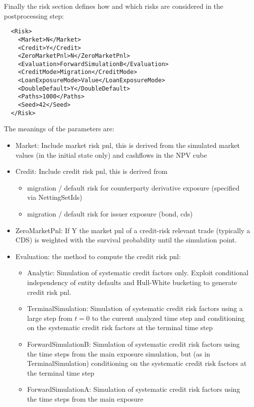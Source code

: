 \documentclass[12pt, a4paper]{article}
\begin{document}
Finally the risk section defines how and which risks are considered in the postprocessing step:

\begin{verbatim}
  <Risk>
    <Market>N</Market>
    <Credit>Y</Credit>
    <ZeroMarketPnl>N</ZeroMarketPnl>
    <Evaluation>ForwardSimulationB</Evaluation>
    <CreditMode>Migration</CreditMode>
    <LoanExposureMode>Value</LoanExposureMode>
    <DoubleDefault>Y</DoubleDefault>
    <Paths>1000</Paths>
    <Seed>42</Seed>
  </Risk>
\end{verbatim}

The meanings of the parameters are:

\begin{itemize}
\item Market: Include market risk pnl, this is derived from the simulated market values (in the initial state only) and
  cashflows in the NPV cube
\item Credit: Include credit risk pnl, this is derived from
  \begin{itemize}
    \item migration / default risk for counterparty derivative exposure (specified via NettingSetIds)
    \item migration / default risk for issuer exposure (bond, cds)
  \end{itemize}
\item ZeroMarketPnl: If Y the market pnl of a credit-risk relevant trade (typically a CDS) is weighted with the survival
  probability until the simulation point.
\item Evaluation: the method to compute the credit risk pnl:
  \begin{itemize}
  \item Analytic: Simulation of systematic credit factors only. Exploit conditional independency of entity defaults and Hull-White bucketing to generate credit risk pnl.
  \item TerminalSimulation: Simulation of systematic credit risk factors using a large step from $t=0$ to the current
    analyzed time step and conditioning on the systematic credit risk factors at the terminal time step
  \item ForwardSimulationB: Simulation of systematic credit risk factors using the time steps from the main exposure
    simulation, but (as in TerminalSimulation) conditioning on the systematic credit risk factors at the terminal time
    step
  \item ForwardSimulationA: Simulation of systematic credit risk factors using the time steps from the main exposure

\end{itemize}
\end{itemize}
\end{document}
